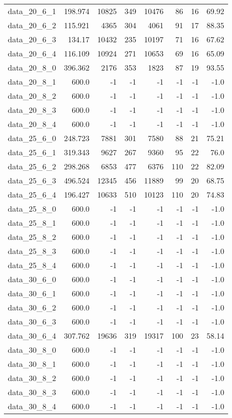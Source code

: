 \begin{tabular}{rrrrrrrr}
  data\_20\_6\_1 & 198.974 & 10825 & 349 & 10476 & 86 & 16 & 69.92 \\
  data\_20\_6\_2 & 115.921 & 4365 & 304 & 4061 & 91 & 17 & 88.35 \\
  data\_20\_6\_3 & 134.17 & 10432 & 235 & 10197 & 71 & 16 & 67.62 \\
  data\_20\_6\_4 & 116.109 & 10924 & 271 & 10653 & 69 & 16 & 65.09 \\
  data\_20\_8\_0 & 396.362 & 2176 & 353 & 1823 & 87 & 19 & 93.55 \\
  data\_20\_8\_1 & 600.0 & -1 & -1 & -1 & -1 & -1 & -1.0 \\
  data\_20\_8\_2 & 600.0 & -1 & -1 & -1 & -1 & -1 & -1.0 \\
  data\_20\_8\_3 & 600.0 & -1 & -1 & -1 & -1 & -1 & -1.0 \\
  data\_20\_8\_4 & 600.0 & -1 & -1 & -1 & -1 & -1 & -1.0 \\
  data\_25\_6\_0 & 248.723 & 7881 & 301 & 7580 & 88 & 21 & 75.21 \\
  data\_25\_6\_1 & 319.343 & 9627 & 267 & 9360 & 95 & 22 & 76.0 \\
  data\_25\_6\_2 & 298.268 & 6853 & 477 & 6376 & 110 & 22 & 82.09 \\
  data\_25\_6\_3 & 496.524 & 12345 & 456 & 11889 & 99 & 20 & 68.75 \\
  data\_25\_6\_4 & 196.427 & 10633 & 510 & 10123 & 110 & 20 & 74.83 \\
  data\_25\_8\_0 & 600.0 & -1 & -1 & -1 & -1 & -1 & -1.0 \\
  data\_25\_8\_1 & 600.0 & -1 & -1 & -1 & -1 & -1 & -1.0 \\
  data\_25\_8\_2 & 600.0 & -1 & -1 & -1 & -1 & -1 & -1.0 \\
  data\_25\_8\_3 & 600.0 & -1 & -1 & -1 & -1 & -1 & -1.0 \\
  data\_25\_8\_4 & 600.0 & -1 & -1 & -1 & -1 & -1 & -1.0 \\
  data\_30\_6\_0 & 600.0 & -1 & -1 & -1 & -1 & -1 & -1.0 \\
  data\_30\_6\_1 & 600.0 & -1 & -1 & -1 & -1 & -1 & -1.0 \\
  data\_30\_6\_2 & 600.0 & -1 & -1 & -1 & -1 & -1 & -1.0 \\
  data\_30\_6\_3 & 600.0 & -1 & -1 & -1 & -1 & -1 & -1.0 \\
  data\_30\_6\_4 & 307.762 & 19636 & 319 & 19317 & 100 & 23 & 58.14 \\
  data\_30\_8\_0 & 600.0 & -1 & -1 & -1 & -1 & -1 & -1.0 \\
  data\_30\_8\_1 & 600.0 & -1 & -1 & -1 & -1 & -1 & -1.0 \\
  data\_30\_8\_2 & 600.0 & -1 & -1 & -1 & -1 & -1 & -1.0 \\
  data\_30\_8\_3 & 600.0 & -1 & -1 & -1 & -1 & -1 & -1.0 \\
  data\_30\_8\_4 & 600.0 & -1 & -1 & -1 & -1 & -1 & -1.0 \\\hline
\end{tabular}
